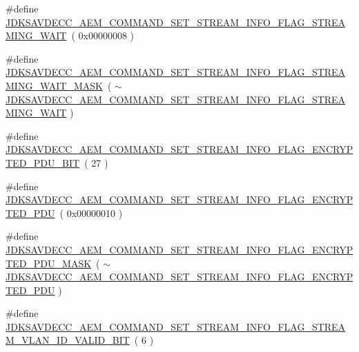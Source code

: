 \begin{DoxyCompactItemize}
\item 
\#define \hyperlink{group__command__set__stream__info_ga69a6deda97cff730b2b2906423ca2770}{J\+D\+K\+S\+A\+V\+D\+E\+C\+C\+\_\+\+A\+E\+M\+\_\+\+C\+O\+M\+M\+A\+N\+D\+\_\+\+S\+E\+T\+\_\+\+S\+T\+R\+E\+A\+M\+\_\+\+I\+N\+F\+O\+\_\+\+F\+L\+A\+G\+\_\+\+S\+T\+R\+E\+A\+M\+I\+N\+G\+\_\+\+W\+A\+IT}~( 0x00000008 )
\item 
\#define \hyperlink{group__command__set__stream__info_ga2ef536a8d5a658f294a2633ff47154ce}{J\+D\+K\+S\+A\+V\+D\+E\+C\+C\+\_\+\+A\+E\+M\+\_\+\+C\+O\+M\+M\+A\+N\+D\+\_\+\+S\+E\+T\+\_\+\+S\+T\+R\+E\+A\+M\+\_\+\+I\+N\+F\+O\+\_\+\+F\+L\+A\+G\+\_\+\+S\+T\+R\+E\+A\+M\+I\+N\+G\+\_\+\+W\+A\+I\+T\+\_\+\+M\+A\+SK}~( $\sim$\hyperlink{group__command__set__stream__info_ga69a6deda97cff730b2b2906423ca2770}{J\+D\+K\+S\+A\+V\+D\+E\+C\+C\+\_\+\+A\+E\+M\+\_\+\+C\+O\+M\+M\+A\+N\+D\+\_\+\+S\+E\+T\+\_\+\+S\+T\+R\+E\+A\+M\+\_\+\+I\+N\+F\+O\+\_\+\+F\+L\+A\+G\+\_\+\+S\+T\+R\+E\+A\+M\+I\+N\+G\+\_\+\+W\+A\+IT} )
\item 
\#define \hyperlink{group__command__set__stream__info_gafae48aac8f72c9fe63f4f39be4502111}{J\+D\+K\+S\+A\+V\+D\+E\+C\+C\+\_\+\+A\+E\+M\+\_\+\+C\+O\+M\+M\+A\+N\+D\+\_\+\+S\+E\+T\+\_\+\+S\+T\+R\+E\+A\+M\+\_\+\+I\+N\+F\+O\+\_\+\+F\+L\+A\+G\+\_\+\+E\+N\+C\+R\+Y\+P\+T\+E\+D\+\_\+\+P\+D\+U\+\_\+\+B\+IT}~( 27 )
\item 
\#define \hyperlink{group__command__set__stream__info_gac418ba4de0c2c8b84186525689c08fce}{J\+D\+K\+S\+A\+V\+D\+E\+C\+C\+\_\+\+A\+E\+M\+\_\+\+C\+O\+M\+M\+A\+N\+D\+\_\+\+S\+E\+T\+\_\+\+S\+T\+R\+E\+A\+M\+\_\+\+I\+N\+F\+O\+\_\+\+F\+L\+A\+G\+\_\+\+E\+N\+C\+R\+Y\+P\+T\+E\+D\+\_\+\+P\+DU}~( 0x00000010 )
\item 
\#define \hyperlink{group__command__set__stream__info_ga19723271dd6ad98c12fd6c4c38fbc5e7}{J\+D\+K\+S\+A\+V\+D\+E\+C\+C\+\_\+\+A\+E\+M\+\_\+\+C\+O\+M\+M\+A\+N\+D\+\_\+\+S\+E\+T\+\_\+\+S\+T\+R\+E\+A\+M\+\_\+\+I\+N\+F\+O\+\_\+\+F\+L\+A\+G\+\_\+\+E\+N\+C\+R\+Y\+P\+T\+E\+D\+\_\+\+P\+D\+U\+\_\+\+M\+A\+SK}~( $\sim$\hyperlink{group__command__set__stream__info_gac418ba4de0c2c8b84186525689c08fce}{J\+D\+K\+S\+A\+V\+D\+E\+C\+C\+\_\+\+A\+E\+M\+\_\+\+C\+O\+M\+M\+A\+N\+D\+\_\+\+S\+E\+T\+\_\+\+S\+T\+R\+E\+A\+M\+\_\+\+I\+N\+F\+O\+\_\+\+F\+L\+A\+G\+\_\+\+E\+N\+C\+R\+Y\+P\+T\+E\+D\+\_\+\+P\+DU} )
\item 
\#define \hyperlink{group__command__set__stream__info_gae32d9a336038a4384ba813bddff308b2}{J\+D\+K\+S\+A\+V\+D\+E\+C\+C\+\_\+\+A\+E\+M\+\_\+\+C\+O\+M\+M\+A\+N\+D\+\_\+\+S\+E\+T\+\_\+\+S\+T\+R\+E\+A\+M\+\_\+\+I\+N\+F\+O\+\_\+\+F\+L\+A\+G\+\_\+\+S\+T\+R\+E\+A\+M\+\_\+\+V\+L\+A\+N\+\_\+\+I\+D\+\_\+\+V\+A\+L\+I\+D\+\_\+\+B\+IT}~( 6 )

\end{DoxyCompactItemize}
